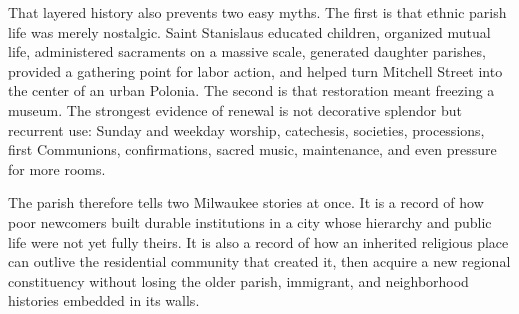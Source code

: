 That layered history also prevents two easy myths. The first is that ethnic parish life was merely nostalgic. Saint Stanislaus educated children, organized mutual life, administered sacraments on a massive scale, generated daughter parishes, provided a gathering point for labor action, and helped turn Mitchell Street into the center of an urban Polonia. The second is that restoration meant freezing a museum. The strongest evidence of renewal is not decorative splendor but recurrent use: Sunday and weekday worship, catechesis, societies, processions, first Communions, confirmations, sacred music, maintenance, and even pressure for more rooms.

The parish therefore tells two Milwaukee stories at once. It is a record of how poor newcomers built durable institutions in a city whose hierarchy and public life were not yet fully theirs. It is also a record of how an inherited religious place can outlive the residential community that created it, then acquire a new regional constituency without losing the older parish, immigrant, and neighborhood histories embedded in its walls.
